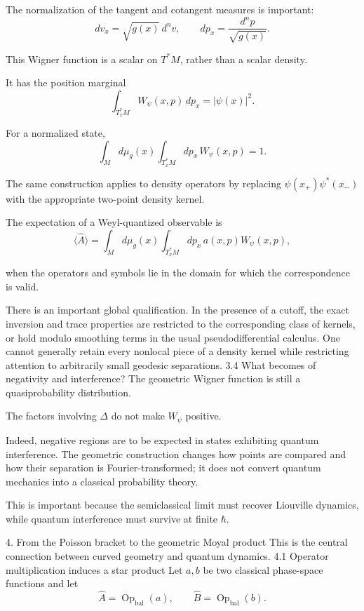 The normalization of the tangent and cotangent measures is important:
\[
dv_x=\sqrt{g(x)}\,d^nv,
\qquad
dp_x=\frac{d^np}{\sqrt{g(x)}}.
\tag{32}
\]

This Wigner function is a scalar on \(T^*M\), rather than a scalar density.

It has the position marginal
\[
\boxed{
\int_{T_x^*M}W_\psi(x,p)\,dp_x
=
|\psi(x)|^2.
}
\tag{33}
\]

For a normalized state,
\[
\int_Md\mu_g(x)\int_{T_x^*M}dp_x\,W_\psi(x,p)=1.
\tag{34}
\]

The same construction applies to density operators by replacing \(\psi(x_+)\psi^*(x_-)\) with the appropriate two-point density kernel.

The expectation of a Weyl-quantized observable is
\[
\langle\widehat A\rangle
=
\int_Md\mu_g(x)
\int_{T_x^*M}dp_x\,
a(x,p)W_\psi(x,p),
\tag{35}
\]

when the operators and symbols lie in the domain for which the correspondence is valid.

There is an important global qualification. In the presence of a cutoff, the exact inversion and trace properties are restricted to the corresponding class of kernels, or hold modulo smoothing terms in the usual pseudodifferential calculus. One cannot generally retain every nonlocal piece of a density kernel while restricting attention to arbitrarily small geodesic separations.
3.4 What becomes of negativity and interference?
The geometric Wigner function is still a quasiprobability distribution.

The factors involving \(\Delta\) do not make \(W_\psi\) positive.

Indeed, negative regions are to be expected in states exhibiting quantum interference. The geometric construction changes how points are compared and how their separation is Fourier-transformed; it does not convert quantum mechanics into a classical probability theory.

This is important because the semiclassical limit must recover Liouville dynamics, while quantum interference must survive at finite \(\hbar\).

4. From the Poisson bracket to the geometric Moyal product
This is the central connection between curved geometry and quantum dynamics.
4.1 Operator multiplication induces a star product
Let \(a,b\) be two classical phase-space functions and let
\[
\widehat A=\operatorname{Op}_{\mathrm{bal}}(a),
\qquad
\widehat B=\operatorname{Op}_{\mathrm{bal}}(b).
\]

